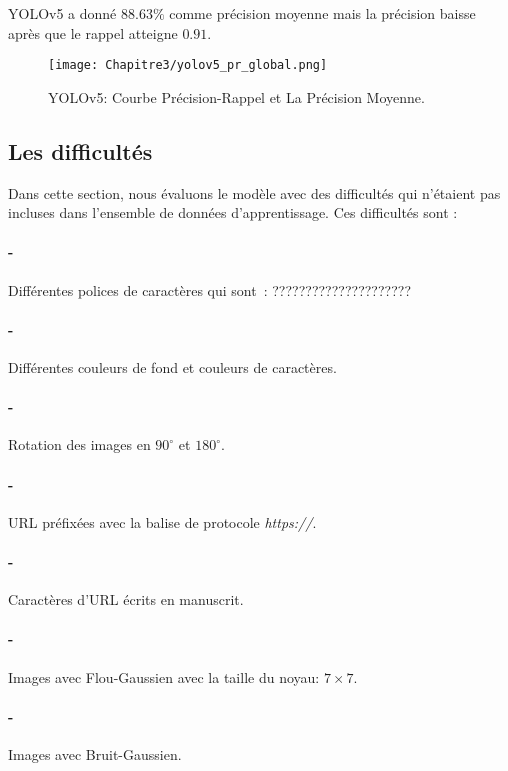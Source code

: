      YOLOv5 a donné $88.63\%$ comme précision moyenne mais la précision baisse après que le rappel atteigne $0.91$.
     \begin{figure}[H]
               \centering
               \texttt{[image: Chapitre3/yolov5\_pr\_global.png]}
               \caption{YOLOv5: Courbe Précision-Rappel et La Précision Moyenne.}
               \label{y5_pr}
               \end{figure}
     
     \subsection{Les difficultés}

          Dans cette section, nous évaluons le modèle avec des difficultés qui n'étaient pas incluses dans l'ensemble de données d'apprentissage. Ces difficultés sont :
          \paragraph{-} Différentes polices de caractères qui sont : ?????????????????????
          \paragraph{-} Différentes couleurs de fond et couleurs de caractères.
          \paragraph{-} Rotation des images en $90^\circ$ et $180^\circ$.
          \paragraph{-} URL préfixées avec la balise de protocole \textit{https://}.
          \paragraph{-} Caractères d'URL écrits en manuscrit.
          \paragraph{-} Images avec Flou-Gaussien avec la taille du noyau: $7\times7$.
          \paragraph{-} Images avec Bruit-Gaussien.

